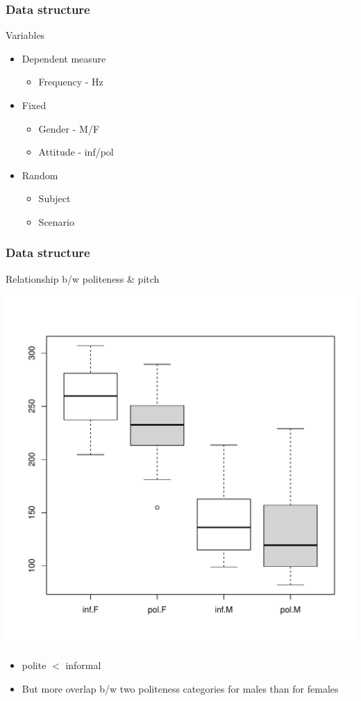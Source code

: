 \documentclass[10p]{beamer}\usepackage[]{graphicx}\usepackage[]{color}
\begin{document}
\begin{frame}
\frametitle{Data structure}
Variables
\begin{itemize}
\item Dependent measure 
	\begin{itemize}
	\item Frequency - Hz
	\end{itemize}
\item Fixed
	\begin{itemize}
	\item Gender - M/F
	\item Attitude - inf/pol
	\end{itemize}
\item Random
	\begin{itemize}
	\item Subject
	\item Scenario
	\end{itemize}
\end{itemize}

\end{frame}

\begin{frame}[fragile]
\frametitle{Data structure}
Relationship b/w politeness \& pitch

\begin{center}
\includegraphics[scale=.28]{figure/box_freq-1}
\end{center}
\begin{itemize}
\item polite $<$ informal
\item But more overlap b/w two politeness categories for males than for females
\end{itemize}
\end{frame}
\end{document}

